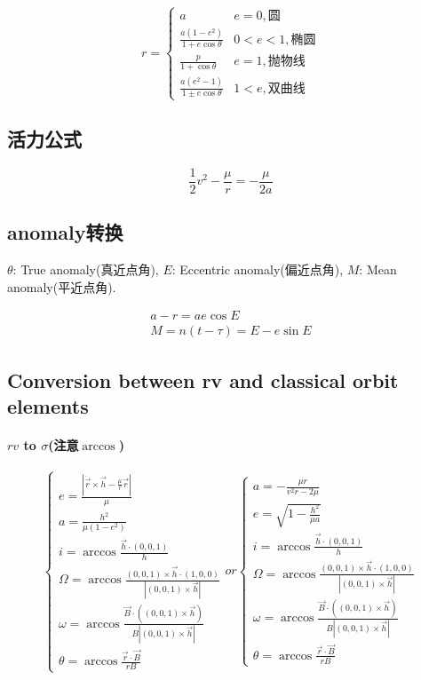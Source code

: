 \documentclass[UTF8]{ctexart}
\begin{document}
\begin{equation}
	r=
	\begin{cases}
		a & e=0,\text{圆}\\
		\frac{a(1-e^2)}{1+e\cos\theta} & 0<e<1,\text{椭圆}\\
		\frac{p}{1+\cos\theta} & e=1,\text{抛物线}\\
		\frac{a(e^2-1)}{1\pm e\cos\theta} & 1<e,\text{双曲线}
	\end{cases}
\end{equation}

\subsection{活力公式}
\begin{equation}
	\frac{1}{2}v^2-\frac{\mu}{r}=-\frac{\mu}{2a}
\end{equation}

\subsection{anomaly转换}

$\theta$: True anomaly(真近点角), $E$: Eccentric anomaly(偏近点角), $M$: Mean anomaly(平近点角).

\begin{gather}
	a-r=ae\cos E\\
	M=n(t-\tau)=E-e\sin E
\end{gather}

\subsection{Conversion between rv and classical orbit elements}
\paragraph{$rv$ to $\sigma$(注意$\arccos$)}
\begin{equation}
	\begin{cases}
		e=\frac{|\dot{\vec{r}}\times\vec{h}-\frac{\mu}{r}\vec{r}|}{\mu}\\
		a=\frac{h^2}{\mu(1-e^2)}\\
		i=\arccos{\frac{\vec{h}\cdot(0,0,1)}{h}}\\
		\Omega=\arccos\frac{(0,0,1)\times\vec{h}\cdot(1,0,0)}{|(0,0,1)\times\vec{h}|}\\
		\omega=\arccos\frac{\vec{B}\cdot((0,0,1)\times\vec{h})}{B|(0,0,1)\times\vec{h}|}\\
		\theta=\arccos\frac{\vec{r}\cdot\vec{B}}{rB}
	\end{cases}or
\begin{cases}
	a=-\frac{\mu r}{v^2r-2\mu}\\
	e=\sqrt{1-\frac{h^2}{\mu a}}\\
	i=\arccos{\frac{\vec{h}\cdot(0,0,1)}{h}}\\
	\Omega=\arccos\frac{(0,0,1)\times\vec{h}\cdot(1,0,0)}{|(0,0,1)\times\vec{h}|}\\
	\omega=\arccos\frac{\vec{B}\cdot((0,0,1)\times\vec{h})}{B|(0,0,1)\times\vec{h}|}\\
	\theta=\arccos\frac{\vec{r}\cdot\vec{B}}{rB}
\end{cases}
\end{equation}
\end{document}
